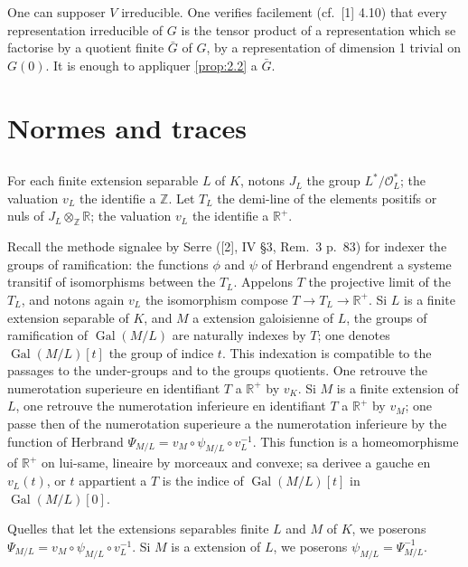 \documentclass[12pt,a4paper]{article}
\theoremstyle{plain}
\theoremstyle{definition}
\theoremstyle{remark}
\newcommand{\cO}{\mathcal{O}}
\newcommand{\bZ}{\mathbb{Z}}
\newcommand{\bR}{\mathbb{R}}
\providecommand{\cO}{\mathcal{O}}
\providecommand{\Gal}{\operatorname{Gal}}
\begin{document}
One can supposer $V$ irreducible. One verifies facilement (cf.~[1] 4.10) that every representation irreducible of $G$ is the tensor product of a representation which se factorise by a quotient finite $\bar{G}$ of $G$, by a representation of dimension 1 trivial on $G(0)$. It is enough to appliquer \ref{prop:2.2} a $\bar{G}$.


\section{Normes and traces}
\label{sec:3}

\subsection{}
\label{sec:3.1}

For each finite extension separable $L$ of $K$, notons $J_L$ the group $L^*/\cO_L^*$; the valuation $v_L$ the identifie a $\bZ$. Let $T_L$ the demi-line of the elements positifs or nuls of $J_L \otimes_\bZ \bR$; the valuation $v_L$ the identifie a $\bR^+$.

Recall the methode signalee by Serre ([2], IV \S 3, Rem.~3 p.~83) for indexer the groups of ramification: the functions $\phi$ and $\psi$ of Herbrand engendrent a systeme transitif of isomorphisms between the $T_L$. Appelons $T$ the projective limit of the $T_L$, and notons again $v_L$ the isomorphism compose $T \to T_L \to \bR^+$. Si $L$ is a finite extension separable of $K$, and $M$ a extension galoisienne of $L$, the groups of ramification of $\Gal(M/L)$ are naturally indexes by $T$; one denotes $\Gal(M/L)[t]$ the group of indice $t$. This indexation is compatible to the passages to the under-groups and to the groups quotients. One retrouve the numerotation superieure en identifiant $T$ a $\bR^+$ by $v_K$. Si $M$ is a finite extension of $L$, one retrouve the numerotation inferieure en identifiant $T$ a $\bR^+$ by $v_M$; one passe then of the numerotation superieure a the numerotation inferieure by the function of Herbrand $\Psi_{M/L} = v_M \circ \psi_{M/L} \circ v_L^{-1}$. This function is a homeomorphisme of $\bR^+$ on lui-same, lineaire by morceaux and convexe; sa derivee a gauche en $v_L(t)$, or $t$ appartient a $T$ is the indice of $\Gal(M/L)[t]$ in $\Gal(M/L)[0]$.

Quelles that let the extensions separables finite $L$ and $M$ of $K$, we poserons $\Psi_{M/L} = v_M \circ \psi_{M/L} \circ v_L^{-1}$. Si $M$ is a extension of $L$, we poserons $\psi_{M/L} = \Psi_{M/L}^{-1}$.
\end{document}
